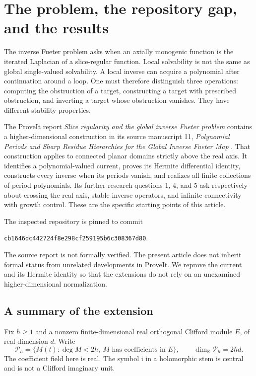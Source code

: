 \documentclass[11pt,a4paper]{article}
\numberwithin{equation}{section}
\theoremstyle{definition}
\theoremstyle{remark}
\newcommand{\R}{\mathbb R}
\newcommand{\ii}{\mathrm i}
\newcommand{\Pspace}{\mathscr P_h}
\newcommand{\repoSHA}{cb1646dc442724f8e298cf259195b6c308367d80}
\begin{document}
\section{The problem, the repository gap, and the results}
\label{sec:intro}

The inverse Fueter problem asks when an axially monogenic function is the
iterated Laplacian of a slice-regular function. Local solvability is not the
same as global single-valued solvability. A local inverse can acquire a
polynomial after continuation around a loop. One must therefore distinguish
three operations: computing the obstruction of a target, constructing a target
with prescribed obstruction, and inverting a target whose obstruction vanishes.
They have different stability properties.

The ProveIt report \emph{Slice regularity and the global inverse Fueter problem}
contains a higher-dimensional construction in its source manuscript 11,
\emph{Polynomial Periods and Sharp Residue Hierarchies for the Global Inverse
Fueter Map} \cite{repo}. That construction applies to connected planar domains
strictly above the real axis. It identifies a polynomial-valued current,
proves its Hermite differential identity, constructs every inverse when its
periods vanish, and realizes all finite collections of period polynomials.
Its further-research questions 1, 4, and 5 ask respectively about crossing the
real axis, stable inverse operators, and infinite connectivity with growth
control. These are the specific starting points of this article.

The inspected repository is pinned to commit
\begin{center}\small\texttt{\repoSHA}.\end{center}
The source report is not formally verified. The present article does not
inherit formal status from unrelated developments in ProveIt. We reprove the
current and its Hermite identity so that the extensions do not rely on an
unexamined higher-dimensional normalization.

\subsection{A summary of the extension}

Fix $h\ge1$ and a nonzero finite-dimensional real orthogonal Clifford module
$E$, of real dimension $d$. Write
\[
 \Pspace=\{M(t):\deg M<2h,\ M\text{ has coefficients in }E\},
 \qquad \dim_\R\Pspace=2hd.
\]
The coefficient field here is real. The symbol $\ii$ in a holomorphic stem is
central and is not a Clifford imaginary unit.
\end{document}

